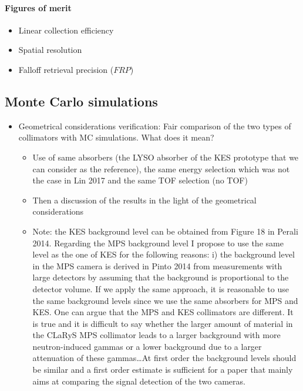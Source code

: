 \documentclass[a4paper,english]{article}
\begin{document}
\paragraph{Figures of merit}

\begin{itemize}
  \item Linear collection efficiency
  \item Spatial resolution
  \item Falloff retrieval precision ($FRP$)
\end{itemize}


\subsection{Monte Carlo simulations}

\begin{itemize}
  \item Geometrical considerations verification: Fair comparison of the two types of collimators with MC simulations. What does it mean? 
  \begin{itemize}
    \item Use of same absorbers (the LYSO absorber of the KES prototype that we can consider as the reference), the same energy selection which was not the case in Lin 2017 and the same TOF selection (no TOF)
    \item Then a discussion of the results in the light of the geometrical considerations
    \item Note: the KES background level can be obtained from Figure 18 in Perali 2014. Regarding the MPS background level I propose to use the same level as the one of KES for the following reasons: i) the background level in the MPS camera is derived in Pinto 2014 from measurements with large detectors by assuming that the background is proportional to the detector volume. If we apply the same approach, it is reasonable to use the same background levels since we use the same absorbers for MPS and KES. One can argue that the MPS and KES collimators are different. It is true and it is difficult to say whether the larger amount of material in the CLaRyS MPS collimator leads to a larger background with more neutron-induced gammas or a lower background due to a larger attenuation of these gammas\dots At first order the background levels should be similar and a first order estimate is sufficient for a paper that mainly aims at comparing the signal detection of the two cameras.
  \end{itemize}    

\end{itemize}
\end{document}
